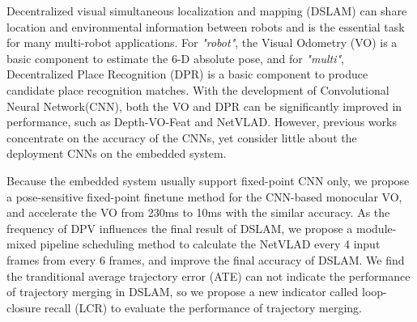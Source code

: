 Decentralized visual simultaneous localization and
mapping (DSLAM) can share location and environmental information between robots and is the essential task for many multi-robot applications. For \textit{"robot"}, the Visual Odometry (VO) is a basic component to estimate the 6-D absolute pose, and for \textit{"multi"}, Decentralized Place Recognition (DPR) is a basic component to produce candidate place recognition matches.
With the development of Convolutional Neural Network(CNN), both the VO and DPR can be significantly improved in performance, such as Depth-VO-Feat\cite{Zhan:2018e92} and NetVLAD\cite{Arandjelovic:2017997}. However, previous works concentrate on the accuracy of the CNNs, yet consider little about the deployment CNNs on the embedded system.

Because the embedded system usually support fixed-point CNN only, we propose a pose-sensitive fixed-point finetune method for the CNN-based monocular VO, and accelerate the VO from 230ms to 10ms with the similar accuracy. As the frequency of DPV influences the final result of DSLAM, we propose a module-mixed pipeline scheduling method to calculate the NetVLAD every 4 input frames from every 6 frames, and improve the final accuracy of DSLAM.
We find the tranditional average trajectory error (ATE) can not indicate the performance of trajectory merging in DSLAM, so we propose a new indicator called loop-closure recall (LCR) to evaluate the performance of trajectory merging.


